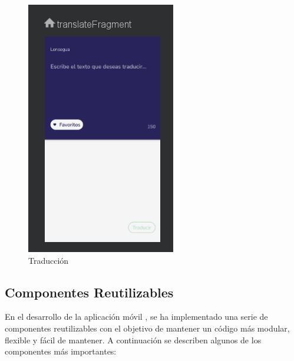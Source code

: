 \begin{figure} [H]
    \centering
    \includegraphics[width=0.3\linewidth]{figuras/tarduccion.png}
    \caption{Traducción}
    \label{fig:enter-label}
\end{figure}



\subsection{Componentes Reutilizables}

En el desarrollo de la aplicación móvil , se ha implementado una serie de componentes reutilizables con el objetivo de mantener un código más modular, flexible y fácil de mantener. A continuación se describen algunos de los componentes más importantes:

